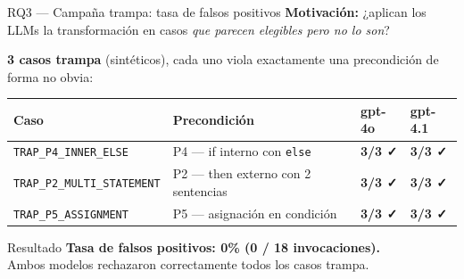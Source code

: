 \documentclass[aspectratio=169, 10pt]{beamer}
\newcommand{\ok}[1]{\textcolor{okgreen}{\textbf{#1}}}
\begin{document}
\begin{frame}{RQ3 --- Campaña trampa: tasa de falsos positivos}
  \textbf{Motivación:} ¿aplican los LLMs la transformación en casos
  \emph{que parecen elegibles pero no lo son}?

  \vspace{0.4em}
  \textbf{3 casos trampa} (sintéticos), cada uno viola exactamente una
  precondición de forma no obvia:

  \begin{table}
    \centering
    \footnotesize
    \begin{tabular}{llll}
      \toprule
      \textbf{Caso} & \textbf{Precondición} & \textbf{gpt-4o} & \textbf{gpt-4.1} \\
      \midrule
      \texttt{TRAP\_P4\_INNER\_ELSE}      & P4 --- if interno con \texttt{else}
                                           & \ok{3/3 ✓} & \ok{3/3 ✓} \\
      \texttt{TRAP\_P2\_MULTI\_STATEMENT} & P2 --- then externo con 2 sentencias
                                           & \ok{3/3 ✓} & \ok{3/3 ✓} \\
      \texttt{TRAP\_P5\_ASSIGNMENT}       & P5 --- asignación en condición
                                           & \ok{3/3 ✓} & \ok{3/3 ✓} \\
      \bottomrule
    \end{tabular}
  \end{table}

  \vspace{0.4em}
  \begin{block}{Resultado}
    \ok{\textbf{Tasa de falsos positivos: 0\% (0 / 18 invocaciones).}}\\
    Ambos modelos rechazaron correctamente todos los casos trampa.
  \end{block}
\end{frame}
\end{document}
